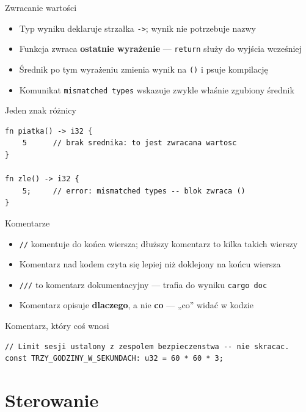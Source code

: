 \begin{frame}[fragile]{Zwracanie wartości}
  \begin{itemize}
    \item Typ wyniku deklaruje strzałka \texttt{->}; wynik nie potrzebuje nazwy
    \item Funkcja zwraca \textbf{ostatnie wyrażenie} --- \texttt{return} służy do wyjścia wcześniej
    \item Średnik po tym wyrażeniu zmienia wynik na \texttt{()} i psuje kompilację
    \item Komunikat \texttt{mismatched types} wskazuje zwykle właśnie zgubiony średnik
  \end{itemize}
  \begin{alertblock}{Jeden znak różnicy}
\begin{lstlisting}
fn piatka() -> i32 {
    5      // brak srednika: to jest zwracana wartosc
}

fn zle() -> i32 {
    5;     // error: mismatched types -- blok zwraca ()
}
\end{lstlisting}
  \end{alertblock}
\end{frame}

\begin{frame}[fragile]{Komentarze}
  \begin{itemize}
    \item \texttt{//} komentuje do końca wiersza; dłuższy komentarz to kilka takich wierszy
    \item Komentarz nad kodem czyta się lepiej niż doklejony na końcu wiersza
    \item \texttt{///} to komentarz dokumentacyjny --- trafia do wyniku \texttt{cargo doc}
    \item Komentarz opisuje \textbf{dlaczego}, a nie \textbf{co} --- „co'' widać w kodzie
  \end{itemize}
  \begin{exampleblock}{Komentarz, który coś wnosi}
\begin{lstlisting}
// Limit sesji ustalony z zespolem bezpieczenstwa -- nie skracac.
const TRZY_GODZINY_W_SEKUNDACH: u32 = 60 * 60 * 3;
\end{lstlisting}
  \end{exampleblock}
\end{frame}

\section{Sterowanie}

